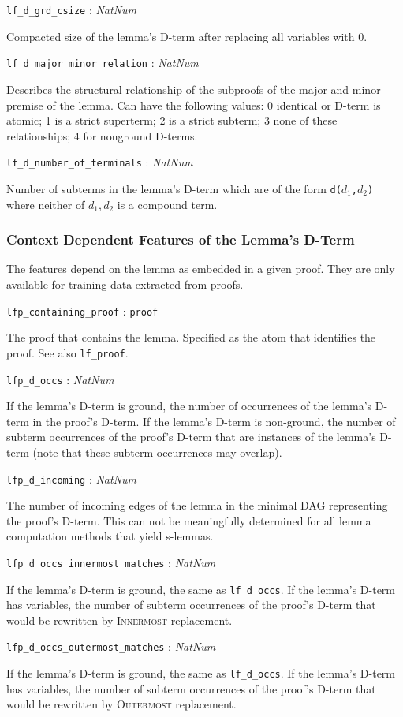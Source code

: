 \documentclass[a4paper,11pt]{article}
\newcommand{\f}[1]{\texttt{#1}}
\newcommand{\lit}[1]{\textnormal{\textit{#1}}}
\newcommand{\propsig}[2]
{\noindent \f{#1} : #2}
\newcommand{\propdesc}[1]
{\par \hspace*{\fill}\begin{minipage}{0.9\textwidth}#1\end{minipage}\par\smallskip}
\begin{document}
\propsig{lf\_d\_grd\_csize}{\lit{NatNum}} \propdesc{Compacted size of the
  lemma's D-term after replacing all variables with 0.}

\propsig{lf\_d\_major\_minor\_relation}{\lit{NatNum}}

\propdesc{Describes the structural relationship of the subproofs of the major
  and minor premise of the lemma. Can have the following values: 0 identical
  or D-term is atomic; 1 is a strict superterm; 2 is a strict subterm; 3 none
  of these relationships; 4 for nonground D-terms.}

\propsig{lf\_d\_number\_of\_terminals}{\lit{NatNum}}

\propdesc{Number of subterms in the lemma's D-term which are of the form
  \f{d($d_1$,$d_2$)} where neither of $d_1,d_2$ is a compound term.}

\subsubsection{Context Dependent Features of the Lemma's D-Term}
\label{sec-lfp-features}

The features depend on the lemma as embedded in a given proof. They are only
available for training data extracted from proofs.

\propsig{lfp\_containing\_proof}{\f{proof}}

\propdesc{The proof that contains the lemma. Specified as the atom that
  identifies the proof. See also \f{lf\_proof}.}

\propsig{lfp\_d\_occs}{\lit{NatNum}} \propdesc{If the lemma's D-term is ground,
  the number of occurrences of the lemma's D-term in the proof's D-term. If
  the lemma's D-term is non-ground, the number of subterm occurrences of the
  proof's D-term that are instances of the lemma's D-term (note that these
  subterm occurrences may overlap).}

\propsig{lfp\_d\_incoming}{\lit{NatNum}} \propdesc{The number of incoming edges
  of the lemma in the minimal DAG representing the proof's D-term. This can
  not be meaningfully determined for all lemma computation methods that yield
  s-lemmas.}

\propsig{lfp\_d\_occs\_innermost\_matches}{\lit{NatNum}} \propdesc{If the lemma's
  D-term is ground, the same as \f{lf\_d\_occs}. If the lemma's D-term has
  variables, the number of subterm occurrences of the proof's D-term that
  would be rewritten by \textsc{Innermost} replacement.}

\propsig{lfp\_d\_occs\_outermost\_matches}{\lit{NatNum}} \propdesc{If the lemma's
  D-term is ground, the same as \f{lf\_d\_occs}. If the lemma's D-term has
  variables, the number of subterm occurrences of the proof's D-term that
  would be rewritten by \textsc{Outermost} replacement.}
\end{document}
